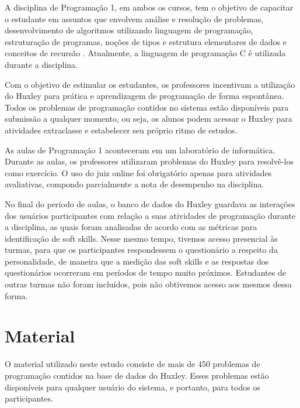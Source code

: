A disciplina de Programação 1, em ambos os cursos, tem o objetivo de capacitar o estudante em assuntos que envolvem análise e resolução de problemas, desenvolvimento de algoritmos utilizando linguagem de programação, estruturação de programas, noções de tipos e estrutura elementares de dados e conceitos de recursão \cite{cc:projeto, ec:projeto}. Atualmente, a linguagem de programação C é utilizada durante a disciplina.

Com o objetivo de estimular os estudantes, os professores incentivam a utilização do Huxley para prática e aprendizagem de programação de forma espontânea. Todos os problemas de programação contidos no sistema estão disponíveis para submissão a qualquer momento, ou seja, os alunos podem acessar o Huxley para atividades extraclasse e estabelecer seu próprio ritmo de estudos.

As aulas de Programação 1 aconteceram em um laboratório de informática. Durante as aulas, os professores utilizaram problemas do Huxley para resolvê-los como exercício. O uso do juiz online foi obrigatório apenas para atividades avaliativas, compondo parcialmente a nota de desempenho na disciplina.

No final do período de aulas, o banco de dados do Huxley guardava as interações dos usuários participantes com relação a suas atividades de programação durante a disciplina, as quais foram analisadas de acordo com as métricas para identificação de soft skills.
Nesse mesmo tempo,  
tivemos acesso presencial às turmas, para que os participantes respondessem o questionário a respeito da personalidade, de maneira que a medição das soft skills e as respostas dos questionários ocorreram em períodos de tempo muito próximos.
Estudantes de outras turmas não foram incluídos, pois não obtivemos acesso aos mesmos dessa forma.

\section{Material}
\label{sec:material}

O material utilizado neste estudo consiste de mais de 450 problemas de programação contidos na base de dados do Huxley. Esses problemas estão disponíveis para qualquer usuário do sistema, e portanto, para todos os participantes.

